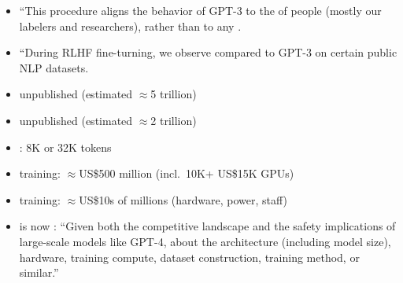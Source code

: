 \documentclass[9pt]{report}
\begin{document}
{
\begin{itemize}
\item 
{\LARGE ``\null}This procedure aligns the behavior of GPT-3 to the  of people (mostly our labelers and researchers), rather
than to any .
\vfill
\item {\LARGE ``\null}During RLHF fine-turning, we observe  compared to GPT-3 on certain public NLP
  datasets.
\end{itemize}

\begin{itemize}
\item {} unpublished (estimated $\approx$5 trillion)
\item {} unpublished (estimated $\approx$2
  trillion)
\item {}: 8K or 32K tokens
\item {} training: $\approx$US\$500 million
  (incl.\ 10K+ US\$15K GPUs)
\item {} training: $\approx$US\$10s of
  millions (hardware, power, staff)
  \vfill
\item {} is now : {\small ``Given both
the competitive landscape and the safety implications of large-scale models like GPT-4,  about the architecture (including model size), hardware, training compute,
dataset construction, training method, or similar.''}
\end{itemize}

}
\end{document}
